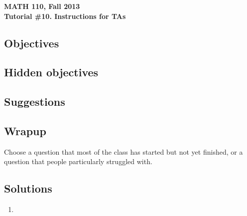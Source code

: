 \documentclass[11pt]{exam}
\newcommand{\mthCourse}{MATH 110}
\newcommand{\mthTerm}{Fall 2013}
\newcommand{\mthTutorialNumber}{10}
\begin{document}
\newpage
{\small
	\begin{center}
		{\bf \mthCourse, \mthTerm}\\ 
		{\bf Tutorial \#\mthTutorialNumber. Instructions for TAs}
	\end{center}
}

\subsection*{Objectives}


\subsection*{Hidden objectives}


\subsection*{Suggestions}

\subsection*{Wrapup}
	Choose a question that most of the class has started but not yet finished,
	or a question that people particularly struggled with.

\subsection*{Solutions}
\begin{enumerate}
	\item
\end{enumerate}
	
\end{document}
